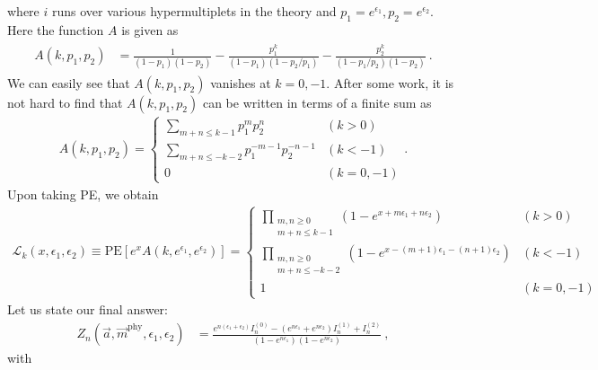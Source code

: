 \documentclass[letterpaper, 11pt]{article}
\def\e{\epsilon}
\begin{document}
where $i$ runs over various hypermultiplets in the theory and $p_1 = e^{\e_1}, p_2 = e^{\e_2}$. Here the function $A$ is given as
\begin{align}
\begin{split}
 A(k, p_1, p_2) &= \frac{1}{(1-p_1)(1-p_2)} -  \frac{p_1^k}{(1-p_1)(1-p_2/p_1)} -  \frac{p_2^k}{(1-p_1/p_2)(1-p_2)}  \ . 
\end{split}
\end{align}
We can easily see that $A(k, p_1, p_2)$ vanishes at $k=0, -1$. 
After some work, it is not hard to find that $A(k, p_1, p_2)$ can be written in terms of a finite sum as
\begin{align}
 A(k, p_1, p_2) =
 \begin{cases}
 \displaystyle
 \sum_{m+n \le k-1} p_1^m p_2^n & (k>0) \\
 \displaystyle
 \sum_{m+n \le -k-2} p_1^{-m-1} p_2^{-n-1} & (k<-1) \\
 0 & (k=0, -1)
 \end{cases} . 
\end{align}
Upon taking PE, we obtain
\begin{align}
\mathcal{L}_{k} (x, \e_1, \e_2) \equiv \textrm{PE}\left[ e^{x} A(k, e^{\e_1}, e^{\e_2}) \right] = 
\begin{cases}
 {\displaystyle \prod_{\substack{m, n \ge 0 \\ m+n \le k-1}} \left( 1-e^{x+ m \e_1 +n  \e_2}\right)} & (k > 0) \\
 {\displaystyle \prod_{\substack{m, n \ge 0 \\ m+n \le -k-2}} \left(1-e^{x -(m+1)\e_1 - (n+1)\e_2} \right)} & (k < -1)  \\
 1 & (k=0, -1)
\end{cases}
\end{align}   
Let us state our final answer:
\begin{align}
 Z_n (\vec{a}, \vec{m}^{\textrm{phy}}, \e_1, \e_2) &= \frac{e^{n(\e_1 + \e_2)} I_n^{(0)} - (e^{n\e_1} + e^{n \e_2}) I_n^{(1)} + I_n^{(2)} }{(1-e^{n\e_1})(1-e^{n\e_2})} \ , 
\end{align}
with 
\end{document}

